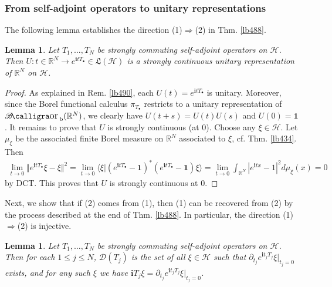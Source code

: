 \documentclass[12pt,b5paper,notitlepage]{article}
\theoremstyle{definition}
\theoremstyle{plain}
\newtheorem{lm}[df]{Lemma}
\DeclareMathOperator{\Borb}{{\mathscr{B}\text{\kern -2pt {\calligra\large or}}\,}_{\mathrm b}}
\newcommand{\fk}{\mathfrak}
\newcommand{\idt}{\mathbf{1}}
\newcommand{\Dom}{\mathscr{D}}
\newcommand{\bk}[1]{\langle {#1}\rangle}
\newcommand{\im}{\mathbf{i}}
\newcommand{\blt}{\bullet}
\newcommand{\Rbb}{\mathbb R}
\newcommand{\MH}{\mathcal H}
\numberwithin{equation}{section}
\begin{document}
\subsubsection{From self-adjoint operators to unitary representations}



The following lemma establishes the direction (1)$\Rightarrow$(2) in Thm. \ref{lb488}.


\begin{lm}\label{lb500}
Let $T_1,\dots,T_N$ be strongly commuting self-adjoint operators on $\MH$. Then $U:t\in\Rbb^N\rightarrow e^{\im tT_\blt}\in\fk L(\MH)$ is a strongly continuous unitary representation of $\Rbb^N$ on $\MH$.
\end{lm}

\begin{proof}
As explained in Rem. \ref{lb490}, each $U(t)=e^{\im tT_\blt}$ is unitary. Moreover, since the Borel functional calculus $\pi_{T_\blt}$ restricts to a unitary representation of $\Borb(\Rbb^N)$, we clearly have $U(t+s)=U(t)U(s)$ and $U(0)=\idt$. It remains to prove that $U$ is strongly continuous (at $0$). Choose any $\xi\in\MH$. Let $\mu_\xi$ be the associated finite Borel measure on $\Rbb^N$ associated to $\xi$, cf. Thm. \ref{lb434}. Then
\begin{align*}
\lim_{t\rightarrow0}\Vert e^{\im tT_\blt}\xi-\xi\Vert^2=\lim_{t\rightarrow0}\bk{\xi|(e^{\im tT_\blt}-\idt)^*(e^{\im tT_\blt}-\idt)\xi}=\lim_{t\rightarrow0}\int_{\Rbb^N}|e^{\im tx}-1|^2d\mu_\xi(x)=0
\end{align*}
by DCT. This proves that $U$ is strongly continuous at $0$.
\end{proof}

Next, we show that if (2) comes from (1), then (1) can be recovered from (2) by the process described at the end of Thm. \ref{lb488}. In particular, the direction (1)$\Rightarrow$(2) is injective.

\begin{lm}\label{lb497}
Let $T_1,\dots,T_N$ be strongly commuting self-adjoint operators on $\MH$. Then for each $1\leq j\leq N$, $\Dom(T_j)$ is the set of all $\xi\in\MH$ such that $\partial_{t_j} e^{\im t_jT_j}\xi\big|_{t_j=0}$ exists, and for any such $\xi$ we have $\im T_j\xi=\partial_{t_j}e^{\im t_jT_j}\xi\big|_{t_j=0}$.
\end{lm}
\end{document}
